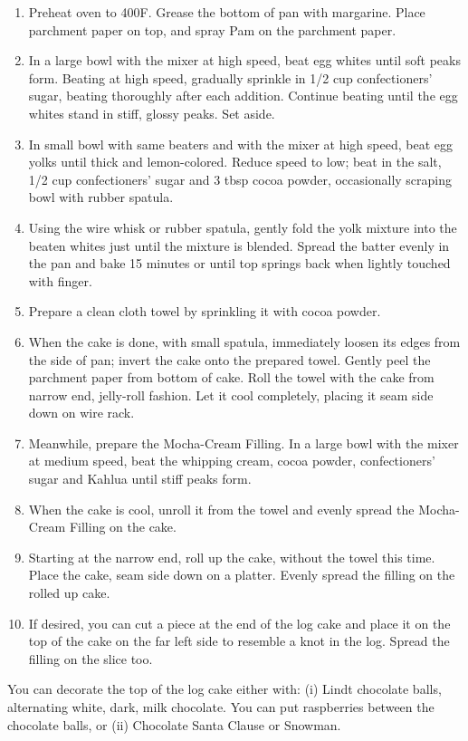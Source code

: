 \begin{enumerate}
    \item Preheat oven to 400\degree F. Grease the bottom of pan with margarine. Place parchment paper on top, and spray Pam on the parchment paper.
    \item In a large bowl with the mixer at high speed, beat egg whites until soft peaks form. Beating at high speed, gradually sprinkle in 1/2 cup confectioners' sugar, beating thoroughly after each addition. Continue beating until the egg whites stand in stiff, glossy peaks. Set aside.
    \item In small bowl with same beaters and with the mixer at high speed, beat egg yolks until thick and lemon-colored. Reduce speed to low; beat in the salt, 1/2 cup confectioners' sugar and 3 tbsp cocoa powder, occasionally scraping bowl with rubber spatula.
    \item Using the wire whisk or rubber spatula, gently fold the yolk mixture into the beaten whites just until the mixture is blended. Spread the batter evenly in the pan and bake 15 minutes or until top springs back when lightly touched with finger.
    \item Prepare a clean cloth towel by sprinkling it with cocoa powder.
    \item When the cake is done, with small spatula, immediately loosen its edges from the side of pan; invert the cake onto the prepared towel. Gently peel the parchment paper from bottom of cake. Roll the towel with the cake from narrow end, jelly-roll fashion. Let it cool completely, placing it seam side down on wire rack.
    \item Meanwhile, prepare the Mocha-Cream Filling. In a large bowl with the mixer at medium speed, beat the whipping cream, cocoa powder, confectioners' sugar and Kahlua until stiff peaks form.
    \item When the cake is cool, unroll it from the towel and evenly spread the Mocha-Cream Filling on the cake.
    \item Starting at the narrow end, roll up the cake, without the towel this time. Place the cake, seam side down on a platter. Evenly spread the filling on the rolled up cake.
    \item If desired, you can cut a piece at the end of the log cake and place it on the top of the cake on the far left side to resemble a knot in the log. Spread the filling on the slice too.
\end{enumerate}

You can decorate the top of the log cake either with: (i) Lindt chocolate balls, alternating white, dark, milk chocolate. You can put raspberries between the chocolate balls, or (ii) Chocolate Santa Clause or Snowman.


